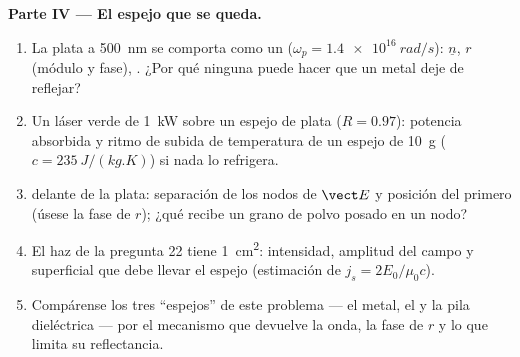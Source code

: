 \begin{problem}
\medskip
\noindent\textbf{Parte IV --- El espejo que se queda.}
\begin{enumerate}[resume]
  \item La plata a \qty{500}{nm} se comporta como un  ($\omega_p = \qty{1.4e16}{rad/s}$):
        $\underline n$, $r$ (módulo y fase), . ¿Por qué ninguna
         puede hacer que un metal deje de reflejar?
  \item Un láser verde de \qty{1}{kW} sobre un espejo de plata ($R = 0.97$): potencia
        absorbida y ritmo de subida de temperatura de un espejo de \qty{10}{g}
        ($c = \qty{235}{J/(kg.K)}$) si nada lo refrigera.
  \item {} delante de la plata: separación de los nodos de
        $\vect E$ y posición del primero (úsese la fase de $r$);
        ¿qué recibe un grano de polvo posado en un nodo?
  \item El haz de la pregunta 22 tiene \qty{1}{cm^2}: intensidad, amplitud
        del campo y  superficial que debe llevar el espejo
        (estimación de  $j_s = 2E_0/\mu_0c$).
  \item Compárense los tres ``espejos'' de este problema --- el metal, el
         y la pila dieléctrica --- por el mecanismo que devuelve
        la onda, la fase de $r$ y lo que limita su
        reflectancia.
\end{enumerate}
\end{problem}
